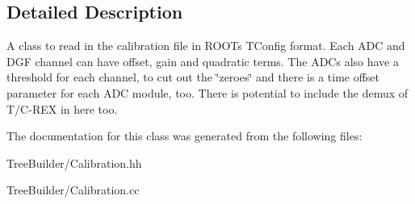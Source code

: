 \subsection{Detailed Description}
A class to read in the calibration file in R\+O\+OT\textquotesingle{}s T\+Config format. Each A\+DC and D\+GF channel can have offset, gain and quadratic terms. The A\+D\+Cs also have a threshold for each channel, to cut out the \char`\"{}zeroes\char`\"{} and there is a time offset parameter for each A\+DC module, too. There is potential to include the demux of T/\+C-\/\+R\+EX in here too. 

The documentation for this class was generated from the following files\+:\begin{DoxyCompactItemize}
\item 
Tree\+Builder/Calibration.\+hh\item 
Tree\+Builder/Calibration.\+cc\end{DoxyCompactItemize}
